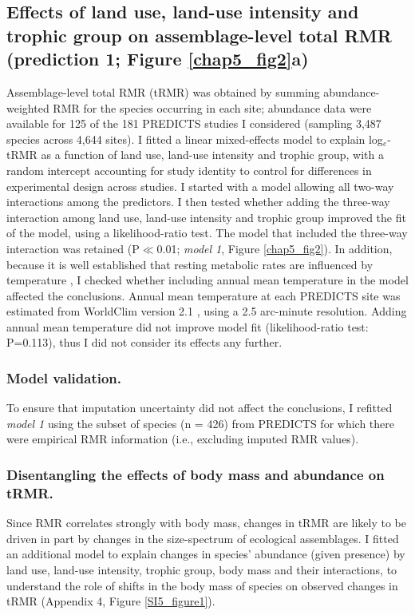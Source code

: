 \subsection{Effects of land use, land-use intensity and trophic group on assemblage-level total RMR (prediction 1; Figure \ref{chap5_fig2}a)}

Assemblage-level total RMR (tRMR) was obtained by summing abundance-weighted RMR for the species occurring in each site; abundance data were available for 125 of the 181 PREDICTS studies I considered (sampling 3,487 species across 4,644 sites). I fitted a linear mixed-effects model to explain log$_e$-tRMR as a function of land use, land-use intensity and trophic group, with a random intercept accounting for study identity to control for differences in experimental design across studies. I started with a model allowing all two-way interactions among the predictors. I then tested whether adding the three-way interaction among land use, land-use intensity and trophic group improved the fit of the model, using a likelihood-ratio test. The model that included the three-way interaction was retained (P$\ll$0.01; \textit{model 1}, Figure \ref{chap5_fig2}). In addition, because it is well established that resting metabolic rates are influenced by temperature \citep{Clarke2004a}, I checked whether including annual mean temperature in the model affected the conclusions. Annual mean temperature at each PREDICTS site was estimated from WorldClim version 2.1 \citep{Fick2017}, using a 2.5 arc-minute resolution. Adding annual mean temperature did not improve model fit (likelihood-ratio test: P=0.113), thus I did not consider its effects any further.   

\subsubsection*{Model validation.}
To ensure that imputation uncertainty did not affect the conclusions, I refitted \textit{model 1} using the subset of species (n = 426) from PREDICTS for which there were empirical RMR information (i.e., excluding imputed RMR values). 

\subsubsection*{Disentangling the effects of body mass and abundance on tRMR.}
Since RMR correlates strongly with body mass, changes in tRMR are likely to be driven in part by changes in the size-spectrum of ecological assemblages. I fitted an additional model to explain changes in species' abundance (given presence) by land use, land-use intensity, trophic group, body mass and their interactions, to understand the role of shifts in the body mass of species on observed changes in tRMR (Appendix 4, Figure \ref{SI5_figure1}).  


